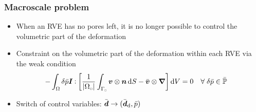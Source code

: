 \documentclass[11pt]{beamer} %
\renewcommand{\dev}{\mathrm{d}}
\newcommand{\volume}{|\Omega_\rve|}
\newcommand{\rve}{
  {\mathchoice
   {\mbox{\scalebox{0.67}{$\Box$}}}
   {\mbox{\scalebox{0.67}{$\Box$}}}
   {\mbox{\scalebox{0.5}{$\Box$}}}
   {\mbox{\scalebox{0.375}{$\Box$}}}
  }
}
\begin{document}
\begin{frame}
 \frametitle{Macroscale problem}
\begin{itemize}
 \item When an RVE has no pores left, it is no longer possible to control the volumetric part of the deformation
\begin{center}
\end{center}


 \item Constraint on the volumetric part of the deformation within each RVE via the weak condition
\begin{align*}
 -\int_\Omega \delta\bar{p} \ts I \dprod \left[\frac{1}{\volume} \int_{\Gamma_\rve} \ta v\outerp\ta n \dif S - \bar{\ta v}\outerp\diff\right] \dif V &= 0\quad\forall\;\delta\bar{p}\in\bar{\set P}
\end{align*}
\item Switch of control variables: $\bar{\ts d} \to (\bar{\ts d}_\dev, \bar{p})$
\end{itemize}
\end{frame}
\end{document}
